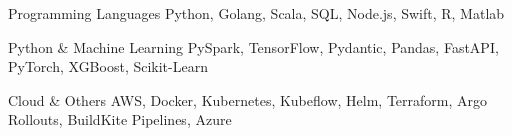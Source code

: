 \begin{cvskills}

  \cvskill
    {Programming Languages}
    {Python, Golang, Scala, SQL, Node.js, Swift, R, Matlab}

  \cvskill
    {Python \& Machine Learning}
    {PySpark, TensorFlow, Pydantic, Pandas, FastAPI, PyTorch, XGBoost, Scikit-Learn}

  \cvskill
    {Cloud \& Others}
    {AWS, Docker, Kubernetes, Kubeflow, Helm, Terraform, Argo Rollouts, BuildKite Pipelines, Azure}

\end{cvskills}
